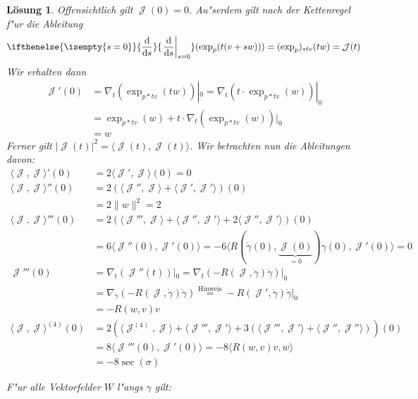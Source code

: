 \documentclass[paper=A4, twoside, chapterprefix=true, bibliography=totoc, headsepline]{scrbook}
\DeclareMathOperator{\calJ}{\mathcal{J}}
\newcommand{\dop}{\mathrm{d}}
\newcommand{\difffrac}[3][]{\ifthenelse{\isempty{#1}}{\frac{\dop #2}{\dop #3}}{\left. \frac{\dop #2}{\dop #3} \right|_{#1}}}
\theoremstyle{plain}
\theoremstyle{nonumberplain}
\theoremstyle{empty}
\theoremstyle{break}
\newtheorem{Loes}{L\"osung}
\begin{document}
\begin{Loes}
Offensichtlich gilt $\calJ(0) = 0$.
Au"serdem gilt nach der Kettenregel f"ur die Ableitung
\begin{align*}
\difffrac[s=0]{}{s} (\exp_p(t(v+sw))) = (\exp_p)_{*tv}(tw) = \calJ(t)
\end{align*}
Wir erhalten dann
\begin{align*}
	\calJ'(0) &= \nabla_t (\exp_{p*tv}(tw))|_0 = \nabla_t (t \cdot \exp_{p*tv}(w))|_0 \\
	&= \exp_{p*tv}(w) + t \cdot \nabla_t (\exp_{p*tv}(w))|_0 \\
	&= w
\end{align*}
Ferner gilt $|\calJ(t)|^2 = \langle \calJ(t), \calJ(t) \rangle$. Wir betrachten nun die Ableitungen davon:
\begin{align*}
	\langle \calJ, \calJ \rangle' (0) &= 2 \langle \calJ', \calJ \rangle (0) = 0 \\
	\langle \calJ, \calJ \rangle'' (0) &= 2 \left( \langle \calJ'', \calJ \rangle + \langle \calJ', \calJ' \rangle \right) (0) \\
	&= 2 \|w\|^2 = 2 \\
	\langle \calJ, \calJ \rangle''' (0) &= 2 \left( \langle \calJ''', \calJ \rangle + \langle \calJ'', \calJ' \rangle + 2 \langle \calJ'', \calJ' \rangle \right) (0) \\
	&= 6 \langle \calJ''(0), \calJ'(0) \rangle = -6 \langle R(\dot\gamma(0), \underbrace{\calJ(0)}_{=0}) \dot\gamma(0), \calJ'(0) \rangle = 0 \\
	\calJ'''(0) &= \nabla_t(\calJ''(t))|_0 = \nabla_t (-R(\calJ, \dot\gamma) \dot\gamma)|_0 \\
	&= \nabla_{\dot\gamma} (-R(\calJ, \dot\gamma) \dot\gamma) \overset{\text{Hinweis}}{=} -R(\calJ', \dot\gamma) \dot\gamma|_0 \\
	&= -R(w,v) v \\
	\langle \calJ, \calJ \rangle^{(4)}(0) &= 2 \left( \langle \calJ^{(4)}, \calJ \rangle + \langle \calJ''', \calJ' \rangle + 3 \left( \langle \calJ''', \calJ' \rangle + \langle \calJ'', \calJ'' \rangle \right) \right) (0) \\
	&= 8 \langle \calJ'''(0), \calJ'(0) \rangle = -8 \langle R(w, v) v, w \rangle \\
	&= -8 \sec(\sigma)
\end{align*}
\begin{description}[leftmargin=*]\item[Beweis des Hinweises]
F"ur alle Vektorfelder $W$ l"angs $\gamma$ gilt:
\begin{align*}

\end{align*}
\end{description}
\end{Loes}
\end{document}
